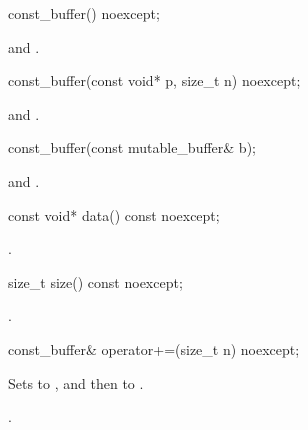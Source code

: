 %
\begin{itemdecl}
const_buffer() noexcept;
\end{itemdecl}

\begin{itemdescr}
\pnum
\postconditions {} and .
\end{itemdescr}

%
\begin{itemdecl}
const_buffer(const void* p, size_t n) noexcept;
\end{itemdecl}

\begin{itemdescr}
\pnum
\postconditions {} and .
\end{itemdescr}

%
\begin{itemdecl}
const_buffer(const mutable_buffer& b);
\end{itemdecl}

\begin{itemdescr}
\pnum
\postconditions {} and .
\end{itemdescr}

%
\begin{itemdecl}
const void* data() const noexcept;
\end{itemdecl}

\begin{itemdescr}
\pnum
\returns {}.
\end{itemdescr}

%
\begin{itemdecl}
size_t size() const noexcept;
\end{itemdecl}

\begin{itemdescr}
\pnum
\returns {}.
\end{itemdescr}

%
\begin{itemdecl}
const_buffer& operator+=(size_t n) noexcept;
\end{itemdecl}

\begin{itemdescr}
\pnum
\effects Sets  to , and then  to .

\pnum
\returns {}.
\end{itemdescr}


